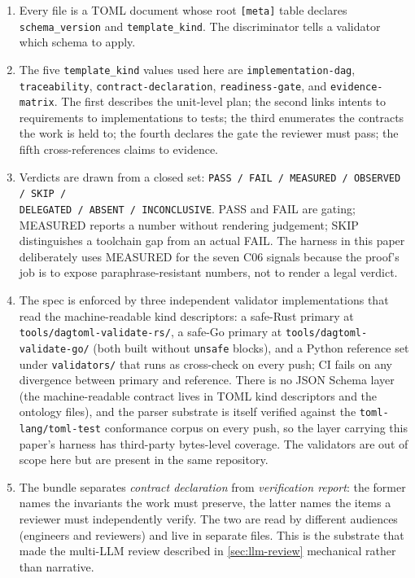 \documentclass[11pt,letterpaper]{article}
\begin{document}
\begin{enumerate}[leftmargin=*,nosep]
  \item Every file is a TOML document whose root \texttt{[meta]} table
    declares \texttt{schema\_version} and \texttt{template\_kind}.
    The discriminator tells a validator which schema to apply.
  \item The five \texttt{template\_kind} values used here are
    \texttt{implementation-dag}, \texttt{traceability},
    \texttt{contract-declaration}, \texttt{readiness-gate}, and
    \texttt{evidence-matrix}. The first describes the unit-level
    plan; the second links intents to requirements to implementations
    to tests; the third enumerates the contracts the work is held to;
    the fourth declares the gate the reviewer must pass; the fifth
    cross-references claims to evidence.
  \item Verdicts are drawn from a closed set:
    \texttt{PASS / FAIL / MEASURED / OBSERVED / SKIP /\\
    DELEGATED / ABSENT / INCONCLUSIVE}. PASS and FAIL are gating;
    MEASURED reports a number without rendering judgement; SKIP
    distinguishes a toolchain gap from an actual FAIL. The harness
    in this paper deliberately uses MEASURED for the seven C06
    signals because the proof's job is to expose paraphrase-resistant
    numbers, not to render a legal verdict.
  \item The spec is enforced by three independent validator
    implementations that read the machine-readable kind descriptors:
    a safe-Rust primary at \texttt{tools/dagtoml-validate-rs/}, a
    safe-Go primary at \texttt{tools/dagtoml-validate-go/} (both
    built without \texttt{unsafe} blocks), and a Python reference
    set under \texttt{validators/} that runs as cross-check on every
    push; CI fails on any divergence between primary and reference.
    There is no JSON Schema layer (the machine-readable contract
    lives in TOML kind descriptors and the ontology files), and the
    parser substrate is itself verified against the
    \texttt{toml-lang/toml-test} conformance corpus on every push,
    so the layer carrying this paper's harness has third-party
    bytes-level coverage. The validators are out of scope here but
    are present in the same repository.
  \item The bundle separates \emph{contract declaration} from
    \emph{verification report}: the former names the invariants the
    work must preserve, the latter names the items a reviewer must
    independently verify. The two are read by different audiences
    (engineers and reviewers) and live in separate files. This is
    the substrate that made the multi-LLM review described in
    \cref{sec:llm-review} mechanical rather than narrative.
\end{enumerate}
\end{document}
